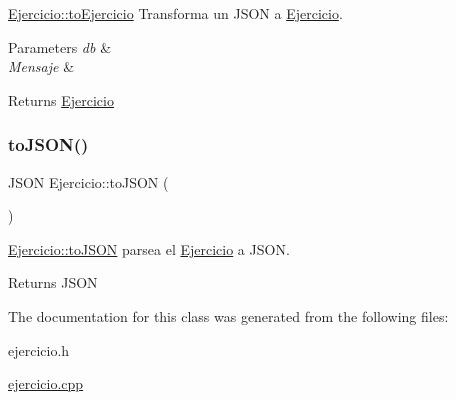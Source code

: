 \mbox{\hyperlink{classEjercicio_a2a96cf1b169835e7fb9546765e11fbc6}{Ejercicio\+::to\+Ejercicio}} Transforma un J\+S\+ON a \mbox{\hyperlink{classEjercicio}{Ejercicio}}. 


\begin{DoxyParams}{Parameters}
{\em db} & \\
\hline
{\em Mensaje} & \\
\hline
\end{DoxyParams}
\begin{DoxyReturn}{Returns}
\mbox{\hyperlink{classEjercicio}{Ejercicio}} 
\end{DoxyReturn}
\mbox{\label{classEjercicio_af4b3083a2d616daee78a5b39c62ff2be}} 
\subsubsection{\texorpdfstring{to\+J\+S\+O\+N()}{toJSON()}}
{\footnotesize\ttfamily J\+S\+ON Ejercicio\+::to\+J\+S\+ON (\begin{DoxyParamCaption}{ }\end{DoxyParamCaption})}



\mbox{\hyperlink{classEjercicio_af4b3083a2d616daee78a5b39c62ff2be}{Ejercicio\+::to\+J\+S\+ON}} parsea el \mbox{\hyperlink{classEjercicio}{Ejercicio}} a J\+S\+ON. 

\begin{DoxyReturn}{Returns}
J\+S\+ON 
\end{DoxyReturn}


The documentation for this class was generated from the following files\+:\begin{DoxyCompactItemize}
\item 
ejercicio.\+h\item 
\mbox{\hyperlink{ejercicio_8cpp}{ejercicio.\+cpp}}\end{DoxyCompactItemize}
